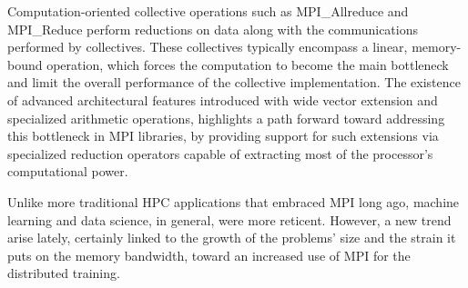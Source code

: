 \documentclass[5p,times,twocolumn]{elsarticle}
\newcommand{\mpi}[0]{\textsc{MPI}\xspace}
\newcommand{\sve}[0]{\textsc{SVE}\xspace}
\begin{document}
Computation-oriented collective operations such as MPI\_Allreduce and MPI\_Reduce perform reductions on
data along with the communications performed by collectives.
These collectives typically encompass a linear, memory-bound operation, which forces
the computation to become the main bottleneck and limit the overall performance of the collective implementation.
The existence of advanced architectural features introduced
with wide vector extension and specialized arithmetic operations, highlights a path forward toward addressing this bottleneck in
MPI libraries, by providing support for such extensions via specialized reduction operators
capable of extracting most of the processor's computational power.


Unlike more traditional HPC applications that embraced MPI long ago,
machine learning and data science, in general, were more reticent. However,
a new trend arise lately, certainly linked to the growth
of the problems' size and the strain it puts on the memory bandwidth, toward an increased use of \mpi for the distributed training.
\end{document}

